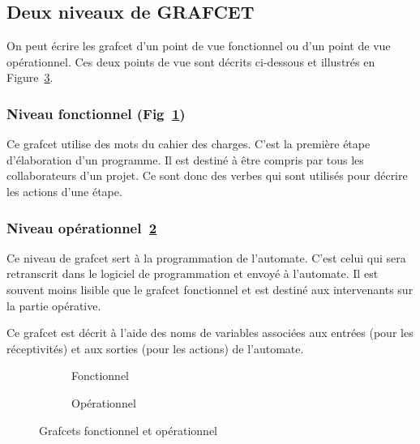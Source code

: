 \subsection{Deux niveaux de GRAFCET}
On peut écrire les grafcet d'un point de vue fonctionnel ou d'un point de vue opérationnel. Ces deux points de vue sont décrits ci-dessous et illustrés en Figure~\ref{fig:fonctionnelVsOperationnel}.
\subsubsection{Niveau fonctionnel (Fig~\ref{fig:grafcetFonct})}
Ce grafcet utilise des mots du cahier des charges. C'est la première étape d'élaboration d'un programme. Il est destiné à être compris par tous les collaborateurs d'un projet. Ce sont donc des verbes qui sont utilisés pour décrire les actions d'une étape.
\subsubsection{Niveau opérationnel~\ref{fig:operationnel}}
Ce niveau de grafcet sert à la programmation de l'automate. C'est celui qui sera retranscrit dans le logiciel de programmation et envoyé à l'automate. Il est souvent moins lisible que le grafcet fonctionnel et est destiné aux intervenants sur la partie opérative.

Ce grafcet est décrit à l'aide des noms de variables associées aux entrées (pour les réceptivités) et aux sorties (pour les actions) de l'automate.


\begin{figure}
  \centering
  \begin{subfigure}[b]{.48\textwidth}
    
    \caption{Fonctionnel}
    \label{fig:grafcetFonct}
  \end{subfigure}
  \begin{subfigure}[b]{.48\textwidth}
    
    \caption{Opérationnel}
    \label{fig:operationnel}
  \end{subfigure}
  \caption{Grafcets fonctionnel et opérationnel}
  \label{fig:fonctionnelVsOperationnel}
\end{figure}
